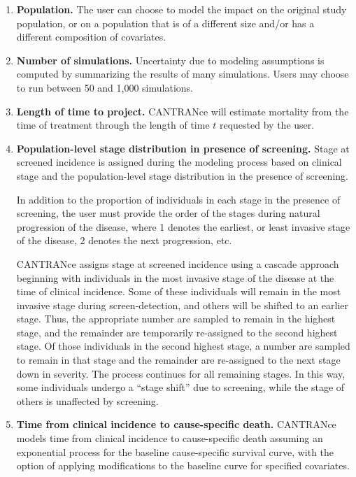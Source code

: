 \documentclass[11pt]{article}
\begin{document}
\begin{enumerate}
    \item \textbf{Population.} The user can choose to model the impact on the original study population, or on a population that is of a different size and/or has a different composition of covariates. 
				
    \item \textbf{Number of simulations.} Uncertainty due to modeling assumptions is computed by summarizing the results of many simulations. 
        Users may choose to run between 50 and 1,000 simulations.
				
    \item \textbf{Length of time to project.} CANTRANce will estimate mortality from the time of treatment through the length of time $t$ requested by the user.

    \item \textbf{Population-level stage distribution in presence of screening.} Stage at screened incidence is assigned during the modeling process based on clinical stage and the population-level stage distribution in the presence of screening. 

    In addition to the proportion of individuals in each stage in the presence of screening, the user must provide the order of the stages during natural progression of the disease, where 1 denotes the earliest, or least invasive stage of the disease, 2 denotes the next progression, etc.

    CANTRANce assigns stage at screened incidence using a cascade approach beginning with individuals in the most invasive stage of the disease at the time of clinical incidence.
    Some of these individuals will remain in the most invasive stage during screen-detection, and others will be shifted to an earlier stage.
    Thus, the appropriate number are sampled to remain in the highest stage, and the remainder are temporarily re-assigned to the second highest stage.
    Of those individuals in the second highest stage, a number are sampled to remain in that stage and the remainder are re-assigned to the next stage down in severity.
    The process continues for all remaining stages.
    In this way, some individuals undergo a ``stage shift'' due to screening, while the stage of others is unaffected by screening.
				
    \item \textbf{Time from clinical incidence to cause-specific death.} CANTRANce models time from clinical incidence to cause-specific death assuming an exponential process for the baseline cause-specific survival curve, with the option of applying modifications to the baseline curve for specified covariates.
				

\end{enumerate}
\end{document}
